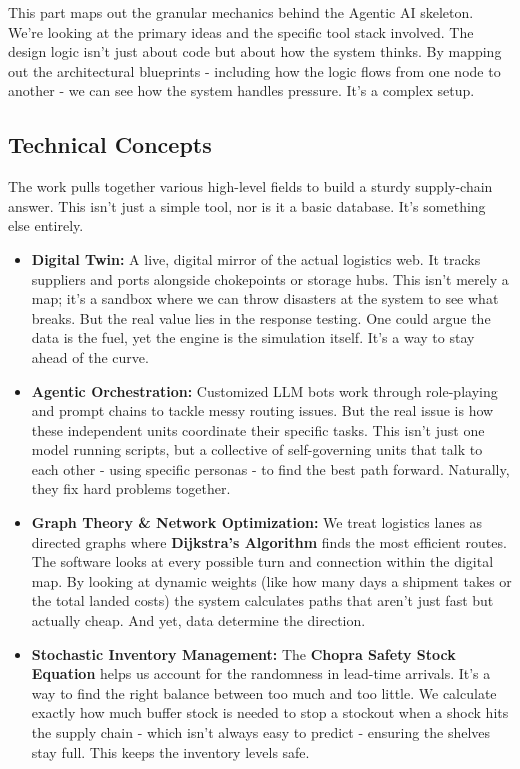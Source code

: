 This part maps out the granular mechanics behind the Agentic AI skeleton. We're looking at the primary ideas and the specific tool stack involved. The design logic isn't just about code but about how the system thinks. By mapping out the architectural blueprints - including how the logic flows from one node to another - we can see how the system handles pressure. It's a complex setup.

\subsection{Technical Concepts}
The work pulls together various high-level fields to build a sturdy supply-chain answer. This isn't just a simple tool, nor is it a basic database. It's something else entirely.
\begin{itemize}
    \item \textbf{Digital Twin:} A live, digital mirror of the actual logistics web. It tracks suppliers and ports alongside chokepoints or storage hubs. This isn't merely a map; it's a sandbox where we can throw disasters at the system to see what breaks. But the real value lies in the response testing. One could argue the data is the fuel, yet the engine is the simulation itself. It's a way to stay ahead of the curve.
    \item \textbf{Agentic Orchestration:} Customized LLM bots work through role-playing and prompt chains to tackle messy routing issues. But the real issue is how these independent units coordinate their specific tasks. This isn't just one model running scripts, but a collective of self-governing units that talk to each other - using specific personas - to find the best path forward. Naturally, they fix hard problems together.
    \item \textbf{Graph Theory \& Network Optimization:} We treat logistics lanes as directed graphs where \textbf{Dijkstra’s Algorithm} finds the most efficient routes. The software looks at every possible turn and connection within the digital map. By looking at dynamic weights (like how many days a shipment takes or the total landed costs) the system calculates paths that aren't just fast but actually cheap. And yet, data determine the direction.
    \item \textbf{Stochastic Inventory Management:} The \textbf{Chopra Safety Stock Equation} helps us account for the randomness in lead-time arrivals. It's a way to find the right balance between too much and too little. We calculate exactly how much buffer stock is needed to stop a stockout when a shock hits the supply chain - which isn't always easy to predict - ensuring the shelves stay full. This keeps the inventory levels safe.
\end{itemize}

